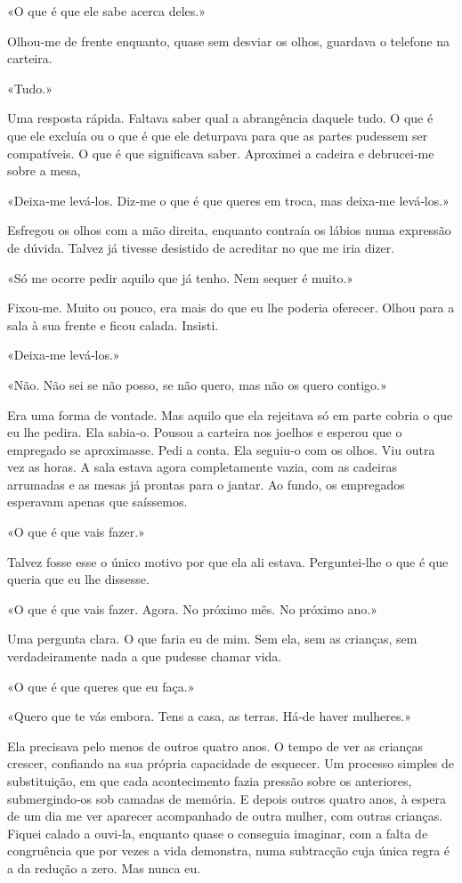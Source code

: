 «O que é que ele sabe acerca deles.»

Olhou­‑me de frente enquanto, quase sem desviar os olhos, guardava o
telefone na carteira.

«Tudo.»

Uma resposta rápida. Faltava saber qual a abrangência daquele tudo. O
que é que ele excluía ou o que é que ele deturpava para que as partes
pudessem ser compatíveis. O que é que significava saber. Aproximei a
cadeira e debrucei­‑me sobre a mesa,

«Deixa­‑me levá­‑los. Diz­‑me o que é que queres em troca, mas deixa­‑me
levá­‑los.»

Esfregou os olhos com a mão direita, enquanto contraía os lábios numa
expressão de dúvida. Talvez já tivesse desistido de acreditar no que me
iria dizer.

«Só me ocorre pedir aquilo que já tenho. Nem sequer é muito.»

Fixou­‑me. Muito ou pouco, era mais do que eu lhe poderia oferecer.
Olhou para a sala à sua frente e ficou calada. Insisti.

«Deixa­‑me levá­‑los.»

«Não. Não sei se não posso, se não quero, mas não os quero contigo.»

Era uma forma de vontade. Mas aquilo que ela rejeitava só em parte
cobria o que eu lhe pedira. Ela sabia­‑o. Pousou a carteira nos joelhos
e esperou que o empregado se aproximasse. Pedi a conta. Ela seguiu­‑o
com os olhos. Viu outra vez as horas. A sala estava agora completamente
vazia, com as cadeiras arrumadas e as mesas já prontas para o jantar. Ao
fundo, os empregados esperavam apenas que saíssemos.

«O que é que vais fazer.»

Talvez fosse esse o único motivo por que ela ali estava. Perguntei­‑lhe
o que é que queria que eu lhe dissesse.

«O que é que vais fazer. Agora. No próximo mês. No próximo ano.»

Uma pergunta clara. O que faria eu de mim. Sem ela, sem as crianças, sem
verdadeiramente nada a que pudesse chamar vida.

«O que é que queres que eu faça.»

«Quero que te vás embora. Tens a casa, as terras. Há­‑de haver
mulheres.»

Ela precisava pelo menos de outros quatro anos. O tempo de ver as
crianças crescer, confiando na sua própria capacidade de esquecer. Um
processo simples de substituição, em que cada acontecimento fazia
pressão sobre os anteriores, submergindo­‑os sob camadas de memória. E
depois outros quatro anos, à espera de um dia me ver aparecer
acompanhado de outra mulher, com outras crianças. Fiquei calado a
ouvi­‑la, enquanto quase o conseguia imaginar, com a falta de
congruência que por vezes a vida demonstra, numa subtracção cuja única
regra é a da redução a zero. Mas nunca eu.

